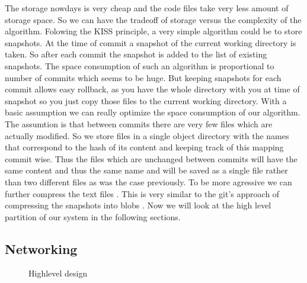 \documentclass[12pt]{article}
\begin{document}
The storage nowdays is very cheap and the code files take very less amount of
storage space. So we can have the tradeoff of storage versus the complexity of
the algorithm.  Folowing the KISS \cite{KISS} principle, a very simple
algorithm could be to store snapshots. At the time of commit a snapshot of the
current working directory is taken. So after each commit the snapshot is added
to the list of existing snapshots.  The space consumption of such an algorithm
is proportional to number of commits which seems to be huge. But keeping
snapshots for each commit allows easy rollback, as you have the whole
directory with you at time of snapshot so you just copy those files to the
current working directory. With a basic assumption we can really optimize the
space consumption of our algorithm. The assumtion is that between commits
there are very few files which are actually modified. So we store files in a
single object directory with the names that correspond to the hash of its
content and keeping track of this mapping commit wise. Thus the files which
are unchanged between commits will have the same content and thus the same
name and will be saved as a single file rather than two different files as was
the case previously. To be more agressive we can further compress the text
files . This is very similar to the git's approach of compressing the
snapshots into blobs \cite{parable}. Now we will look at the high level
partition of our system in the following sections.

\subsection{Networking}

\begin{wrapfigure}[11]{r}{9cm}
\centering
{}
\caption{Highlevel design}
\end{wrapfigure}
\end{document}
